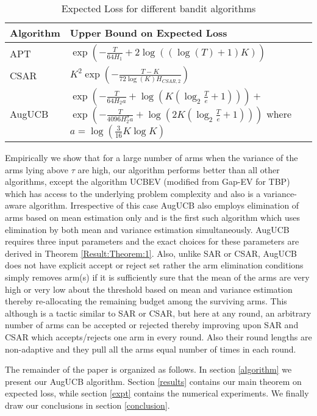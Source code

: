 \begin{table}[h]
\caption{Expected Loss for different bandit algorithms}
\label{tab:regret-bds}
\begin{center}
\begin{tabular}{|p{1.3cm}|p{6.33cm}|}
\toprule
Algorithm  & Upper Bound on Expected Loss \\
\midrule
APT         &$\exp(-\frac{T}{64 H_1}+2\log((\log(T)+1)K))$ \\\midrule
CSAR		&$K^2\exp(-\frac{T-K}{72\log(K)H_{CSAR,2}})$ \\\midrule
AugUCB      &
$\exp\left( -\frac{T}{ 64 H_2 a} + \log\left(K\left(\log_2\frac{T}{e}+1\right)\right)\right)+$\newline
 $ \exp\left(- \frac{T}{4096 H_{2}^{\sigma} a}
 + \log\left(2K\left(\log_2\frac{T}{e}+1\right)\right) \right) $\newline
 where $a=\log(\frac{3}{16} K\log K)$
\\\bottomrule
\end{tabular}
\end{center}
\end{table}
Empirically we show that for a large number of arms when the variance of the arms lying above $\tau$ are high, our algorithm performs better than all other algorithms, except the algorithm UCBEV (modified from Gap-EV for TBP) which has access to the underlying problem complexity and also is a variance-aware algorithm. Irrespective of this case AugUCB also employs elimination of arms based on mean estimation only and is the first such algorithm which uses elimination by both mean and variance estimation simultaneously. AugUCB requires three input parameters and the exact choices for these parameters are derived in Theorem \ref{Result:Theorem:1}. Also, unlike SAR or CSAR, AugUCB does not have explicit accept or reject set rather the arm elimination conditions simply removes arm(s) if it is sufficiently sure that the mean of the arms are very high or very low about the threshold based on mean and variance estimation thereby re-allocating the remaining budget among the surviving arms. This although is a tactic similar to SAR or CSAR, but here at any round, an arbitrary number of arms can be accepted or rejected thereby improving upon SAR and CSAR which accepts/rejects one arm in every round. Also their round lengths are non-adaptive and they pull all the arms equal number of times in each round. 

The remainder of the paper is organized as follows. In section \ref{algorithm} we present our AugUCB algorithm. 
Section \ref{results} contains our main theorem on expected loss, while section \ref{expt} contains the numerical experiments. We finally draw our conclusions in section \ref{conclusion}.


  